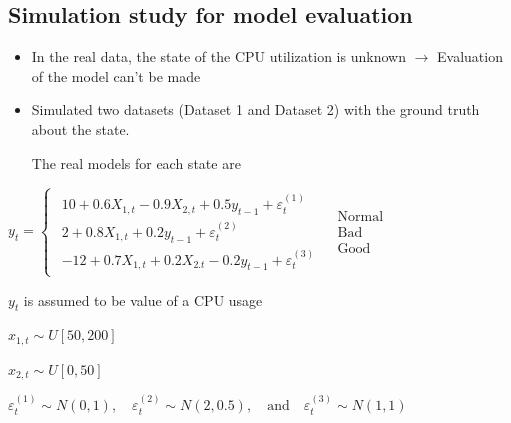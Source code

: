 \documentclass{beamer}
\begin{document}
\subsection{Simulation study for model evaluation}
\begin{frame}
\begin{itemize}
	\item In the real data, the state of the CPU utilization is unknown $\rightarrow$ Evaluation of the model can't be made
	\pause

	\item Simulated two datasets (Dataset 1 and Dataset 2) with the ground truth about the state. 

	The real models for each state are
\end{itemize}

$y_{t}=\begin{cases}
\begin{array}{c}
10+0.6X_{1,t}-0.9X{}_{2,t}+0.5y_{t-1}+\varepsilon_{t}^{(1)}\\
2+0.8X_{1,t}+0.2y_{t-1}+\varepsilon_{t}^{(2)}\\
-12+0.7X_{1,t}+0.2X{}_{2.t}-0.2y_{t-1}+\varepsilon_{t}^{(3)}
\end{array} & \begin{array}{c}
\mathrm{Normal}\\
\mathrm{Bad}\\
\mathrm{Good}
\end{array}\end{cases}$
\vspace{1em}

$y_{t}$ is assumed to be value of a CPU usage

$x_{1,t}\sim U[50,200]$

$x_{2,t}\sim U[0,50]$ 

$\varepsilon_{t}^{(1)}\sim N(0,1),\quad \varepsilon_{t}^{(2)}\sim N(2,0.5),\quad \mathrm{and} \quad \varepsilon_{t}^{(3)}\sim N(1,1)$

\end{frame}
\end{document}
